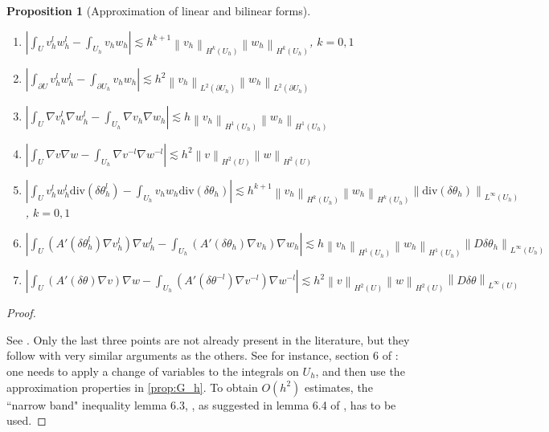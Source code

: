 \documentclass[english,a4paper,10pt,oneside]{scrbook}	%
\theoremstyle{break}
\newtheorem{prop}[equation]{Proposition}
\newenvironment{mproof}[1][\proofname]{%
  \begin{proof}[#1]$ $\par\nobreak\ignorespaces
}{%
  \end{proof}
}
\renewcommand*{\proofname}{Proof}
\theoremstyle{remark}
\newcommand{\ds}{\displaystyle}
\newcommand{\norm}[1]{\left\lVert#1\right\rVert}
\newcommand{\te}{\theta}
\newcommand{\dive}{\text{div}}
\begin{document}
\begin{appendices}
\begin{prop}[Approximation of linear and bilinear forms]
\begin{enumerate}
	\item $\ds \left | \int_U v_h^lw_h^l - \int_{U_h}v_hw_h\right |\lesssim h^{k+1} \norm{v_h}_{H^k(U_h)}\norm{w_h}_{H^k(U_h)}$, $k=0,1$
	\item $\ds \left | \int_{\partial U} v_h^lw_h^l - \int_{\partial U_h}v_hw_h\right |\lesssim h^2 \norm{v_h}_{L^2(\partial U_h)}\norm{w_h}_{L^2(\partial U_h)}$
	\item $\ds \left | \int_U \nabla v_h^l\nabla w_h^l - \int_{U_h}\nabla v_h\nabla w_h\right |\lesssim h \norm{v_h}_{H^1(U_h)}\norm{w_h}_{H^1(U_h)}$
	\item $\ds \left | \int_U \nabla v\nabla w - \int_{U_h}\nabla v^{-l}\nabla w^{-l}\right |\lesssim h^2 \norm{v}_{H^2(U)}\norm{w}_{H^2(U)}$
	\item $\ds \left | \int_U v_h^l w_h^l \dive(\delta  \te_h^l) - \int_{U_h}v_h w_h \dive(\delta \te_h)\right |\lesssim h^{k+1} \norm{v_h}_{H^k(U_h)}\norm{w_h}_{H^k(U_h)} \norm{\dive(\delta \te_h)}_{L^\infty(U_h)}$, $k=0,1$
	\item $\ds \left | \int_U (A'(\delta	\te_h^l)\nabla v_h^l)\nabla w_h^l - \int_{U_h}(A'(\delta	\te_h)\nabla v_h)\nabla w_h\right |\lesssim h \norm{v_h}_{H^1(U_h)}\norm{w_h}_{H^1(U_h)}\norm{D\delta \te_h}_{L^\infty(U_h)}$
	\item $\ds \left | \int_U (A'(\delta	\te)\nabla v)\nabla w - \int_{U_h}(A'(\delta	\te^{-l})\nabla v^{-l})\nabla w^{-l}\right |\lesssim h^2 \norm{v}_{H^2(U)}\norm{w}_{H^2(U)}\norm{D\delta \te}_{L^\infty(U)}$
\end{enumerate}
\end{prop}

\begin{mproof}
See \cite{edelmann}. Only the last three points are not already present in the literature, but they follow with very similar arguments as the others. See for instance, section 6 of \cite{elliott}: one needs to apply a change of variables to the integrals on $U_h$, and then use the approximation properties in \cref{prop:G_h}. To obtain $O(h^2)$ estimates, the ``narrow band" inequality lemma 6.3, \cite{elliott}, as suggested in  lemma 6.4 of \cite{elliott}, has to be used.


\end{mproof}
\end{appendices}
\end{document}
